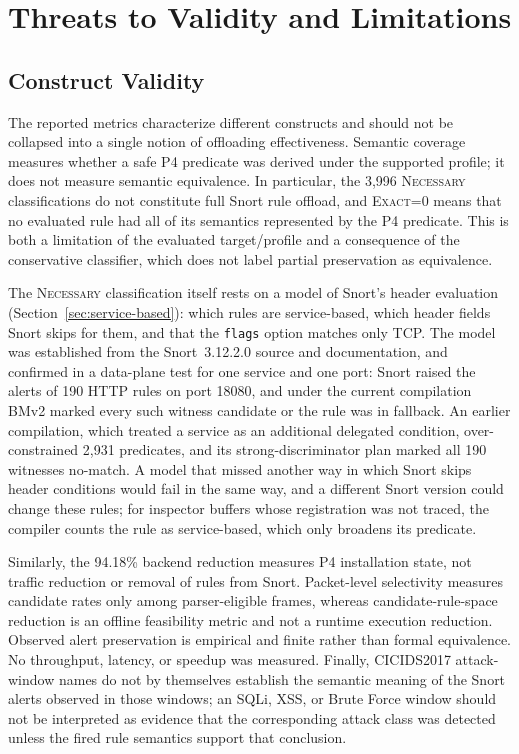 \documentclass{article}
\begin{document}
\section{Threats to Validity and Limitations}
\label{sec:threats}
\subsection{Construct Validity}
The reported metrics characterize different constructs and should not be
collapsed into a single notion of offloading effectiveness. Semantic coverage
measures whether a safe P4 predicate was derived under the supported profile;
it does not measure semantic equivalence. In particular, the 3,996
\textsc{Necessary} classifications do not constitute full Snort rule
offload, and \textsc{Exact}=0 means that no evaluated rule had all of its
semantics represented by the P4 predicate. This is both a limitation of the
evaluated target/profile and a consequence of the conservative classifier,
which does not label partial preservation as equivalence.

The \textsc{Necessary} classification itself rests on a model of Snort's
header evaluation (Section~\ref{sec:service-based}): which rules are
service-based, which header fields Snort skips for them, and that the
\texttt{flags} option matches only TCP. The model was established from the
Snort~3.12.2.0 source and documentation, and confirmed in a data-plane test
for one service and one port: Snort raised the alerts of 190 HTTP rules on
port 18080,
and under the current compilation BMv2 marked every such witness candidate
or the rule was in fallback. An earlier compilation, which treated a service as an
additional delegated condition, over-constrained 2,931 predicates, and its
strong-discriminator plan marked all 190 witnesses no-match. A model that
missed another way in which Snort skips header conditions would fail in the
same way, and a different Snort version could change these rules; for
inspector buffers whose registration was not traced, the compiler counts the
rule as service-based, which only broadens its predicate.

Similarly, the 94.18\% backend reduction measures P4 installation state,
not traffic reduction or removal of rules from Snort. Packet-level
selectivity measures candidate rates only among parser-eligible frames,
whereas candidate-rule-space reduction is an offline feasibility metric and
not a runtime execution reduction. Observed alert preservation is empirical
and finite rather than formal equivalence. No throughput, latency, or speedup
was measured. Finally, CICIDS2017 attack-window names do not by themselves
establish the semantic meaning of the Snort alerts observed in those windows;
an SQLi, XSS, or Brute Force window should not be interpreted as evidence
that the corresponding attack class was detected unless the fired rule
semantics support that conclusion.
\end{document}
